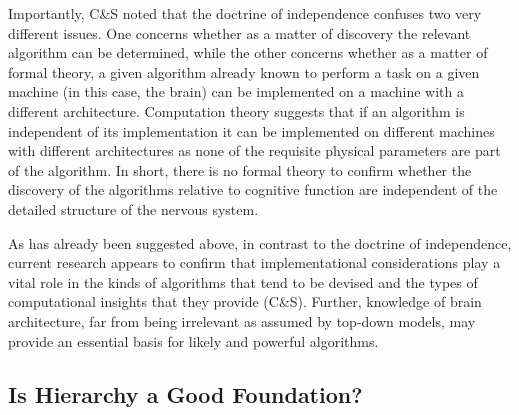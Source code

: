\documentclass[10pt,letterpaper]{article}
\begin{document}
Importantly, C\&S noted that the doctrine of independence confuses two very different issues. One concerns whether as a matter of discovery the relevant algorithm can be determined, while the other concerns whether as a matter of formal theory, a given algorithm already known to perform a task on a given machine (in this case, the brain) can be implemented on a machine with a different architecture. Computation theory suggests that if an algorithm is independent of its implementation it can be implemented on different machines with different architectures as none of the requisite physical parameters are part of the algorithm. In short, there is no formal theory to confirm whether the discovery of the algorithms relative to cognitive function are independent of the detailed structure of the nervous system.

As has already been suggested above, in contrast to the doctrine of independence, current research appears to confirm that implementational considerations play a vital role in the kinds of algorithms that tend to be devised and the types of computational insights that they provide (C\&S). Further, knowledge of brain architecture, far from being irrelevant as assumed by top-down models, may provide an essential basis for likely and powerful algorithms.

\subsection*{Is Hierarchy a Good Foundation?}


\end{document}
